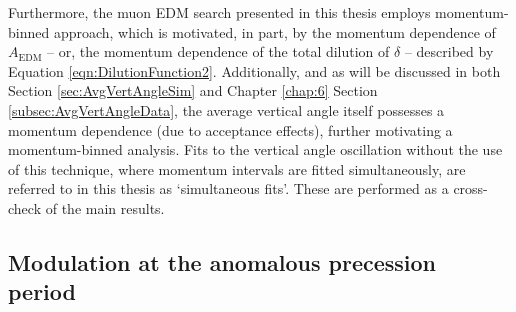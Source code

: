 Furthermore, the muon EDM search presented in this thesis employs momentum-binned approach, which is motivated, in part, by the momentum dependence of $A_{\text{EDM}}$ -- or, the momentum dependence of the total dilution of $\delta$ -- described by Equation \ref{eqn:DilutionFunction2}. Additionally, and as will be discussed in both Section \ref{sec:AvgVertAngleSim} and Chapter \ref{chap:6} Section \ref{subsec:AvgVertAngleData}, the average vertical angle itself possesses a momentum dependence (due to acceptance effects), further motivating a momentum-binned analysis. Fits to the vertical angle oscillation without the use of this technique, where momentum intervals are fitted simultaneously, are referred to in this thesis as `simultaneous fits'. These are performed as a cross-check of the main results. 



\subsection{Modulation at the anomalous precession period}\label{sec:TimeMod}

